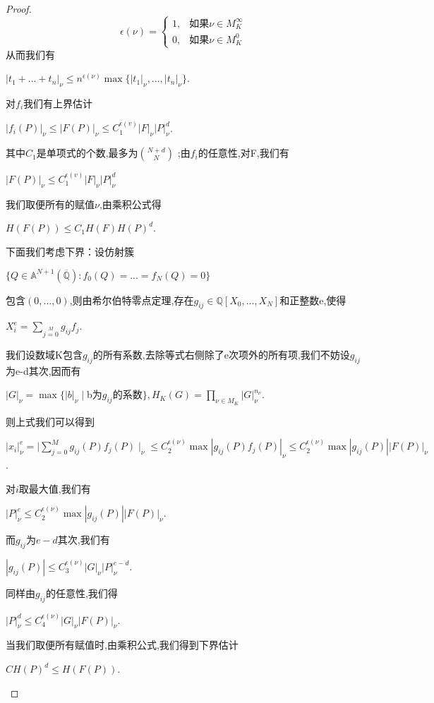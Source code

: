 \documentclass[11pt]{ctexart}
\DeclareMathOperator{\Max}{max}
\begin{document}
\begin{proof}
    \begin{equation}
    \epsilon(\nu) =\begin{cases}
        1 ,&\text{如果} \nu \in M_K^{\infty}\\
        0 ,&\text{如果} \nu \in M_K^{0}
    \end{cases}
    \end{equation}
从而我们有
\begin{center}
    $|t_1+...+t_n|_{\nu}\leq n^{\epsilon(\nu)}\Max\{|t_1|_{\nu},...,|t_n|_{\nu}\}$.
\end{center}
对$f_i$我们有上界估计
\begin{center}
    $|f_i(P)|_{\nu}\leq |F(P)|_{\nu}  \leq   C_1^{\epsilon(v)}|F|_{\nu}|P|_{\nu}^{d}$.
\end{center}
其中$C_1$是单项式的个数,最多为$\binom{N+d}{N}$ ;由$f_i$的任意性,对F,我们有
\begin{center}
    $|F(P)|_{\nu}\leq C_1^{\epsilon(v)}|F|_{\nu}|P|_{\nu}^{d}$
\end{center}
我们取便所有的赋值$\nu$,由乘积公式得
\begin{center}
    $H(F(P))\leq C_1H(F)H(P)^d$.
\end{center}
下面我们考虑下界：设仿射簇
\begin{center}
    $\{Q\in \mathbb{A}^{N+1}(\overline{\mathbb{Q}}):f_0(Q)=...=f_N(Q)=0\}$
\end{center}
包含$(0,...,0)$,则由希尔伯特零点定理,存在$g_{ij}\in \mathbb{Q}[X_0,...,X_N]$和正整数e,使得
\begin{center}
    $X_i^{e}=\sum\limits_{j=0}\limits^{M}g_{ij}f_j $.
\end{center}
我们设数域K包含$g_{ij}$的所有系数,去除等式右侧除了e次项外的所有项,我们不妨设$g_{ij}$为e-d其次,因而有
\begin{center}
    $|G|_{\nu}=\Max \{|b|_{\nu}\mid $b为$g_{ij}$的系数$\}$$,H_K(G)=\prod\limits_{\nu \in M_K}|G|_{\nu}^{n_{\nu}} $.
\end{center}
则上式我们可以得到
\begin{center}
    $|x_i|_{\nu}^{e}=\mid \sum\limits_{j=0}^{M}g_{ij}(P)f_j(P)\mid_{\nu}\leq C_2^{\epsilon(\nu)} \Max |g_{ij}(P)f_j(P)|_{\nu}\leq C_2^{\epsilon(\nu)}\Max |g_{ij}(P)||F(P)|_{\nu}$.
\end{center}
对$i$取最大值,我们有
\begin{center}
    $|P|_{\nu}^e\leq C_2^{\epsilon(\nu)}\Max |g_{ij}(P)||F(P)|_{\nu}$.
\end{center}
而$g_{ij}$为$e-d$其次,我们有
\begin{center}
    $|g_{ij}(P)|\leq C_3^{\epsilon(\nu)}|G|_{\nu}|P|_{\nu}^{e-d}$.
\end{center}
同样由$g_{ij}$的任意性,我们得
\begin{center}
    $|P|_{\nu}^{d}\leq C_4^{\epsilon(\nu)}|G|_{\nu}|F(P)|_{\nu}$.
\end{center}
当我们取便所有赋值时,由乘积公式,我们得到下界估计
\begin{center}
    $CH(P)^d\leq H(F(P))$.
\end{center}


\end{proof}
\end{document}
